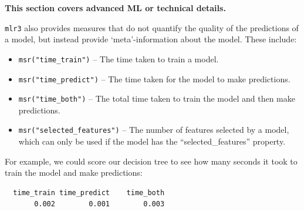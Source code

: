 \begin{tcolorbox}[enhanced jigsaw, colframe=quarto-callout-note-color-frame, rightrule=.15mm, bottomrule=.15mm, toprule=.15mm, opacityback=0, colback=white, left=2mm, arc=.35mm, breakable, leftrule=.75mm]
\begin{minipage}[t]{5.5mm}
\textcolor{quarto-callout-note-color}{\faInfo}
\end{minipage}%
\begin{minipage}[t]{\textwidth - 5.5mm}

\textbf{This section covers advanced ML or technical
details.}\vspace{2mm}

\end{minipage}%
\end{tcolorbox}

\texttt{mlr3} also provides measures that do not quantify the quality of
the predictions of a model, but instead provide `meta'-information about
the model. These include:

\begin{itemize}
\tightlist
\item
  \texttt{msr("time\_train")} -- The time taken to train a model.
\item
  \texttt{msr("time\_predict")} -- The time taken for the model to make
  predictions.
\item
  \texttt{msr("time\_both")} -- The total time taken to train the model
  and then make predictions.
\item
  \texttt{msr("selected\_features")} -- The number of features selected
  by a model, which can only be used if the model has the
  ``selected\_features'' property.
\end{itemize}

For example, we could score our decision tree to see how many seconds it
took to train the model and make predictions:

\begin{Shaded}
\begin{Highlighting}[]
\OtherTok{=} \NormalTok{(}\NormalTok{(}\NormalTok{, }\NormalTok{, }\NormalTok{))}
\SpecialCharTok{$}
\end{Highlighting}
\end{Shaded}

\begin{verbatim}
  time_train time_predict    time_both 
       0.002        0.001        0.003 
\end{verbatim}

